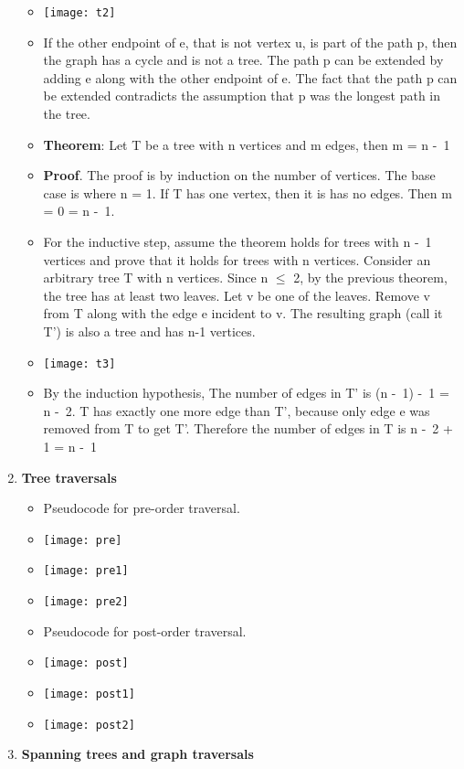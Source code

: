 \documentclass[12pt,a4paper]{article}
\begin{document}
\begin{enumerate}
\begin{itemize}
    \item[] \texttt{[image: t2]}
    \item If the other endpoint of e, that is not vertex u, is part of the path p, then the graph has a cycle and is not a tree. The path p can be extended by adding e along with the other endpoint of e. The fact that the path p can be extended contradicts the assumption that p was the longest path in the tree.
    \item \textbf{Theorem}: Let T be a tree with n vertices and m edges, then m = n -\ 1
    \item \textbf{Proof}. The proof is by induction on the number of vertices. The base case is where n = 1. If T has one vertex, then it is has no edges. Then m = 0 = n -\ 1.
    \item For the inductive step, assume the theorem holds for trees with n -\ 1 vertices and prove that it holds for trees with n vertices. Consider an arbitrary tree T with n vertices. Since n \(\leq \) 2, by the previous theorem, the tree has at least two leaves. Let v be one of the leaves. Remove v from T along with the edge e incident to v. The resulting graph (call it T') is also a tree and has n-1 vertices.
    \item[] \texttt{[image: t3]}
    \item By the induction hypothesis, The number of edges in T' is (n -\ 1) -\ 1 = n -\ 2. T has exactly one more edge than T', because only edge e was removed from T to get T'. Therefore the number of edges in T is n -\ 2 + 1 = n -\ 1 
  \end{itemize}
  \item \textbf{Tree traversals}
  \begin{itemize}
    \item Pseudocode for pre-order traversal.
    \item[] \texttt{[image: pre]}
    \item[] \texttt{[image: pre1]} 
    \item[] \texttt{[image: pre2]} 
    \item Pseudocode for post-order traversal.
    \item[] \texttt{[image: post]}
    \item[] \texttt{[image: post1]}
    \item[] \texttt{[image: post2]} 
  \end{itemize}
  \item \textbf{Spanning trees and graph traversals}
  \begin{itemize}

\end{itemize}
\end{enumerate}
\end{document}
